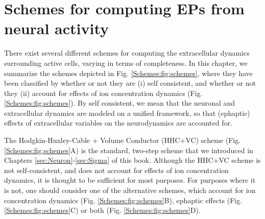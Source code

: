 \section{Schemes for computing EPs from neural activity}
\label{sec:Schemes}

There exist several different schemes for computing the extracellular dynamics surrounding active cells, varying in terms of completeness. In this chapter, we summarize the schemes depicted in Fig. \ref{Schemes:fig:schemes}, where they have been classified by whether or not they are (i) self consistent, and whether or not they (ii) account for effects of ion concentration dynamics (Fig. \ref{Schemes:fig:schemes}). By self consistent, we mean that the neuronal and extracellular dynamics are modeled on a unified framework, so that (ephaptic) effects of extracellular variables on the neurodynamics are accounted for. 

The Hodgkin-Huxley-Cable + Volume Conductor (HHC+VC) scheme (Fig. \ref{Schemes:fig:schemes}A) is the standard, two-step scheme that we introduced in Chapters \ref{sec:Neuron}-\ref{sec:Sigma} of this book. Although the HHC+VC scheme is not self-consistent, and does not account for effects of ion concentration dynamics, it is thought to be sufficient for most purposes. For purposes where it is not, one should consider one of the alternative schemes, which account for ion concentration dynamics (Fig. \ref{Schemes:fig:schemes}B), ephaptic effects (Fig. \ref{Schemes:fig:schemes}C) or both (Fig. \ref{Schemes:fig:schemes}D).
 


